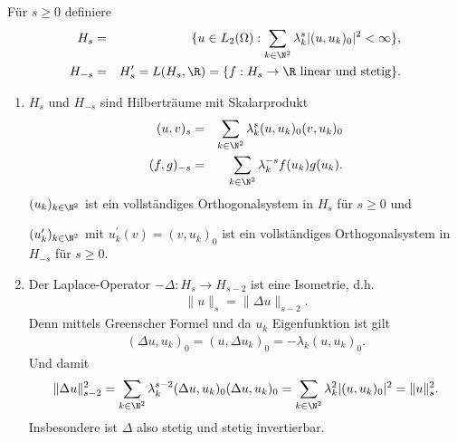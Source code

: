 \begin{Definition}
    \label{def:2.17}
    Für $s \ge 0$ definiere
    \begin{eqnarray*}
            H_s
        &=& \{u \in L_2(\Omega):
            \sum_{k\in\N^2} \lambda_k^s |(u, u_k)_0|^2 < \infty\}, \\
            H_{-s}
        &=& H_s^\prime = L(H_s, \R)
        =  \{f: H_s \to \R \text{ linear und stetig}\}.
    \end{eqnarray*}
\end{Definition}


\begin{Bemerkung}
    \begin{enumerate}[1)]
	\item
	    $H_s$ und $H_{-s}$ sind Hilberträume mit Skalarprodukt
	    \begin{eqnarray*}
                (u, v)_s
            &=& \sum_{k\in\N^2} \lambda_k^s (u, u_k)_0 (v, u_k)_0 \\
                (f, g)_{-s}
            &=& \sum_{k\in\N^2} \lambda_k^{-s} f(u_k) g(u_k).
	    \end{eqnarray*}
	    $(u_k)_{k\in\N^2}$ ist ein vollständiges Orthogonalsystem in
	    $H_s$ für $s \ge 0$ und

	    $(u_k^\prime)_{k\in\N^2}$ mit
	    $u_k^\prime (v) = (v, u_k)_0$ ist ein vollständiges Orthogonalsystem
	    in $H_{-s}$ für $s \ge 0$.
	\item
	    Der Laplace-Operator $-\Delta: H_s \to H_{s-2}$ ist eine Isometrie,
	    d.h.
	    \begin{eqnarray*}
            \|u\|_s = \|\Delta u\|_{s-2}.
	    \end{eqnarray*}
	    Denn mittels Greenscher Formel und da $u_k$ Eigenfunktion ist gilt
	    \begin{eqnarray*}
            (\Delta u, u_k)_0 = (u, \Delta u_k)_0 = -\lambda_k (u, u_k)_0.
	    \end{eqnarray*}
	    Und damit
	    \begin{eqnarray*}
              \|\Delta u\|_{s-2}^2
            = \sum_{k\in\N^2} \lambda_k^{s-2} (\Delta u, u_k)_0
              (\Delta u, u_k)_0
            = \sum_{k\in\N^2} \lambda_k^2 |(u, u_k)_0|^2
            = \|u\|_s^2.
	    \end{eqnarray*}
	    Insbesondere ist $\Delta$ also stetig und stetig invertierbar.


\end{enumerate}
\end{Bemerkung}
